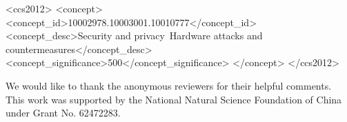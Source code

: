 \documentclass[sigconf]{acmart}
\begin{document}
\begin{CCSXML}
<ccs2012>
   <concept>
       <concept_id>10002978.10003001.10010777</concept_id>
       <concept_desc>Security and privacy~Hardware attacks and countermeasures</concept_desc>
       <concept_significance>500</concept_significance>
       </concept>
 </ccs2012>
\end{CCSXML}



\maketitle










\begin{acks}
We would like to thank the anonymous reviewers for their helpful
comments. This work was supported by the National Natural Science Foundation of China under Grant No. 62472283.

\end{acks}




\end{document}

